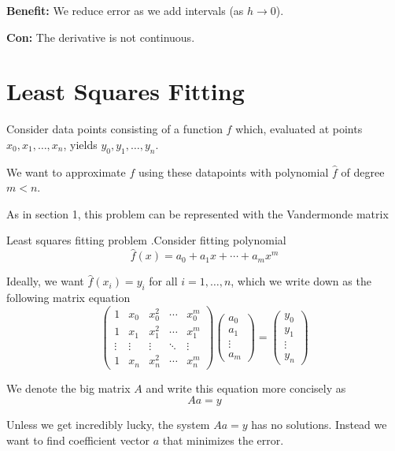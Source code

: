 \documentclass[12pt,letterpaper]{article}
\begin{document}
\textbf{Benefit:} We reduce error as we add intervals (as $h \rightarrow 0$).

\textbf{Con:} The derivative is not continuous.

\section{Least Squares Fitting}
Consider data points consisting of a function $f$ which, evaluated at points $x_0, x_1, \dots, x_n$, yields $y_0, y_1, \dots, y_n$.

We want to approximate $f$ using these datapoints with polynomial $\hat{f}$ of degree $m < n$.

As in section 1, this problem can be represented with the Vandermonde matrix
\begin{constr}{Least squares fitting problem}
.Consider fitting polynomial
\begin{equation}
	\hat{f}(x) = a_0 + a_1 x + \cdots + a_m x^m
\end{equation}

Ideally, we want $\hat{f}(x_i) = y_i$ for all $i=1, \dots, n$, which we write down as the following matrix equation
\begin{equation}
\begin{pmatrix}
	1 & x_0 & x_0^2 & \cdots & x_0^m \\
	1 & x_1 & x_1^2 & \cdots & x_1^m \\
	\vdots & \vdots & \vdots & \ddots & \vdots \\
	1 & x_n & x_n^2 & \cdots & x_n^m
\end{pmatrix}
\begin{pmatrix}
	a_0 \\ a_1 \\ \vdots \\ a_m
\end{pmatrix} =
\begin{pmatrix}
	y_0 \\ y_1 \\ \vdots \\ y_n
\end{pmatrix}
\end{equation}

We denote the big matrix $A$ and write this equation more concisely as
\begin{equation}
	Aa = y
\end{equation}
\label{constr:least_squares}
\end{constr}

Unless we get incredibly lucky, the system $Aa = y$ has no solutions. Instead we want to find coefficient vector $a$ that minimizes the error.
\end{document}
